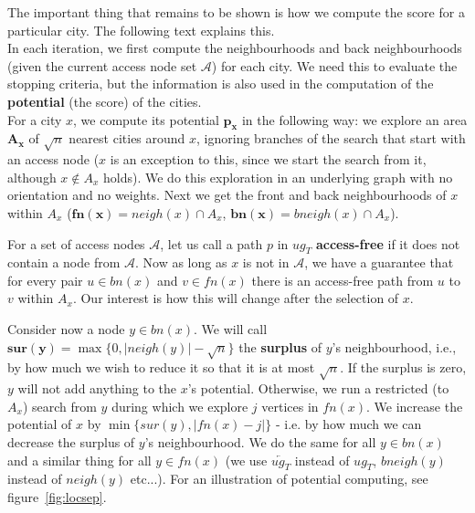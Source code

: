 		The important thing that remains to be shown is how we compute the score for a particular city. The following text explains this. \\
		
		\noindent In each iteration, we first compute the neighbourhoods and back neighbourhoods (given the current access node set $\mathcal{A}$) for each city. We need this to evaluate the stopping criteria, but the information is also used in the computation of the \textbf{potential} (the score) of the cities. \\
		
		\noindent For a city $x$, we compute its potential $\bm{p_{x}}$ in the following way: we explore an area $\bm{A_{x}}$ of $\sqrt{n}$ nearest cities around $x$, ignoring branches of the search that start with an access node ($x$ is an exception to this, since we start the search from it, although $x \not \in A_{x}$ holds). We do this exploration in an underlying graph with no orientation and no weights. Next we get the front and back neighbourhoods of $x$ within $A_{x}$ ($\bm{fn(x)} = neigh(x) \cap A_{x}$, $\bm{bn(x)} = bneigh(x) \cap A_{x}$).
		
		For a set of access nodes $\mathcal{A}$, let us call a path $p$ in $ug_{T}$ \textbf{access-free} if it does not contain a node from $\mathcal{A}$. Now as long as $x$ is not in $\mathcal{A}$, we have a guarantee that for every pair $u \in bn(x)$ and $v \in fn(x)$ there is an access-free path from $u$ to $v$ within $A_{x}$. Our interest is how this will change after the selection of $x$.
				
		Consider now a node $y \in bn(x)$. We will call $\bm{sur(y)} = \max\{0, |neigh(y)| - \sqrt{n}\}$ the \textbf{surplus} of $y$'s neighbourhood, i.e., by how much we wish to reduce it so that it is at most $\sqrt{n}$. If the surplus is zero, $y$ will not add anything to the $x$'s potential. Otherwise, we run a restricted (to $A_{x}$) search from $y$ during which we explore $j$ vertices in $fn(x)$. We increase the potential of $x$ by $\min\{sur(y), |fn(x) - j|\}$ - i.e. by how much we can decrease the surplus of $y$'s neighbourhood. We do the same for all $y \in bn(x)$ and a similar thing for all $y \in fn(x)$ (we use $\overleftarrow{ug_{T}}$ instead of $ug_{T}$, $bneigh(y)$ instead of $neigh(y)$ etc...). For an illustration of potential computing, see figure~\ref{fig:locsep}. \\
		
